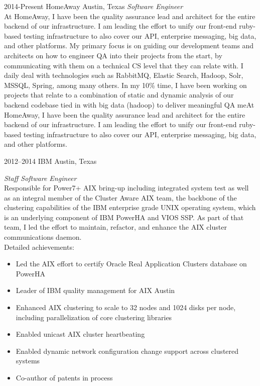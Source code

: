 \documentclass['print']{friggeri-cv} %
\begin{document}
\begin{entrylist}
\entry
{2014-Present}
{HomeAway}
{Austin, Texas}
{\emph{Software Engineer} \\
At HomeAway, I have been the quality assurance lead and architect for the entire backend of our infrastructure. I am leading the effort to unify our front-end ruby-based testing infrastructure to also cover our API, enterprise messaging, big data, and other platforms.
\newline
\newline
My primary focus is on guiding our development teams and architects on how to engineer QA into their projects from the start, by communicating with them on a technical CS level that they can relate with. I daily deal with technologies such as RabbitMQ, Elastic Search, Hadoop, Solr, MSSQL, Spring, among many others.
\newline
\newline
In my 10\% time, I have been working on projects that relate to a combination of static and dynamic analysis of our backend codebase tied in with big data (hadoop) to deliver meaningful QA meAt HomeAway, I have been the quality assurance lead and architect for the entire backend of our infrastructure. I am leading the effort to unify our front-end ruby-based testing infrastructure to also cover our API, enterprise messaging, big data, and other platforms.}
\end{entrylist}
\begin{entrylist}
\entry
{2012--2014}
{IBM}
{Austin, Texas}
{\emph{Staff Software Engineer} \\
Responsible for Power7+ AIX bring-up including integrated system test as well as an integral member of the
Cluster Aware AIX team, the backbone of the clustering capabilities of the IBM enterprise grade UNIX operating system,
which is an underlying component of IBM PowerHA and VIOS SSP. As part of that team, I led the effort to maintain, refactor,
and enhance the AIX cluster communications daemon. \\
Detailed achievements:
\begin{itemize}
\item Led the AIX effort to certify Oracle Real Application Clusters database on PowerHA
\item Leader of IBM quality management for AIX Austin
\item Enhanced AIX clustering to scale to 32 nodes and 1024 disks per node, including parallelization of core clustering libraries
\item Enabled unicast AIX cluster heartbeating
\item Enabled dynamic network configuration change support across clustered systems
\item Co-author of patents in process
\end{itemize}}
\end{entrylist}
\end{document}
